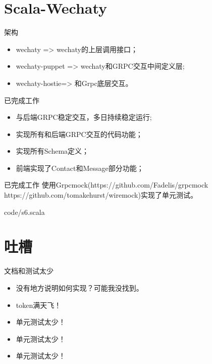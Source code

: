 \documentclass[10pt,aspectratio=43,mathserif,table]{beamer}
\begin{document}
\section{Scala-Wechaty}
\begin{frame}{架构}
  \begin{itemize}
    \item<1-> wechaty => wechaty的上层调用接口；
    \item<1-> wechaty-puppet => wechaty和GRPC交互中间定义层;
    \item<1-> wechaty-hostie=> 和Grpc底层交互。
  \end{itemize}
\end{frame}
\begin{frame}{已完成工作}
  \begin{itemize}
    \item<1-> 与后端GRPC稳定交互，多日持续稳定运行;
    \item<1-> 实现所有和后端GRPC交互的代码功能；
    \item<1-> 实现所有Schema定义；
    \item<1-> 前端实现了Contact和Message部分功能；
  \end{itemize}
\end{frame}
\begin{frame}{已完成工作}
    使用Grpcmock(https://github.com/Fadelis/grpcmock https://github.com/tomakehurst/wiremock)实现了单元测试。
  
  {code/s6.scala}
\end{frame}

\section{吐槽}
\begin{frame}{文档和测试太少}
  \begin{itemize}
    \item<1-> 没有地方说明如何实现？可能我没找到。
    \item<1-> token满天飞！
    \item<1-> 单元测试太少！
    \item<1-> 单元测试太少！
    \item<1-> 单元测试太少！
  \end{itemize}
\end{frame}
\end{document}

